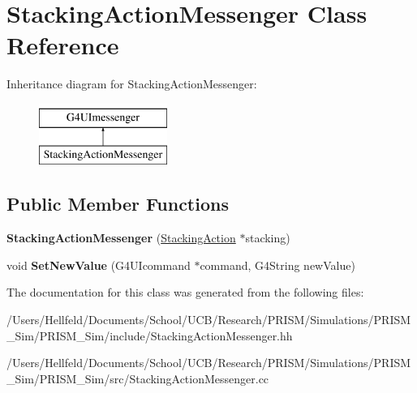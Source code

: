 \hypertarget{class_stacking_action_messenger}{}\section{Stacking\+Action\+Messenger Class Reference}
\label{class_stacking_action_messenger}
Inheritance diagram for Stacking\+Action\+Messenger\+:\begin{figure}[H]
\begin{center}
\leavevmode
\includegraphics[height=2.000000cm]{class_stacking_action_messenger}
\end{center}
\end{figure}
\subsection*{Public Member Functions}
\begin{DoxyCompactItemize}
\item 
\hypertarget{class_stacking_action_messenger_a8c37e8a04787ecaedf44167055981ab5}{}\label{class_stacking_action_messenger_a8c37e8a04787ecaedf44167055981ab5} 
{\bfseries Stacking\+Action\+Messenger} (\hyperlink{class_stacking_action}{Stacking\+Action} $\ast$stacking)
\item 
\hypertarget{class_stacking_action_messenger_a33a2e7e11bb0f2790e6f6d25afb15842}{}\label{class_stacking_action_messenger_a33a2e7e11bb0f2790e6f6d25afb15842} 
void {\bfseries Set\+New\+Value} (G4\+U\+Icommand $\ast$command, G4\+String new\+Value)
\end{DoxyCompactItemize}


The documentation for this class was generated from the following files\+:\begin{DoxyCompactItemize}
\item 
/\+Users/\+Hellfeld/\+Documents/\+School/\+U\+C\+B/\+Research/\+P\+R\+I\+S\+M/\+Simulations/\+P\+R\+I\+S\+M\+\_\+\+Sim/\+P\+R\+I\+S\+M\+\_\+\+Sim/include/Stacking\+Action\+Messenger.\+hh\item 
/\+Users/\+Hellfeld/\+Documents/\+School/\+U\+C\+B/\+Research/\+P\+R\+I\+S\+M/\+Simulations/\+P\+R\+I\+S\+M\+\_\+\+Sim/\+P\+R\+I\+S\+M\+\_\+\+Sim/src/Stacking\+Action\+Messenger.\+cc\end{DoxyCompactItemize}
